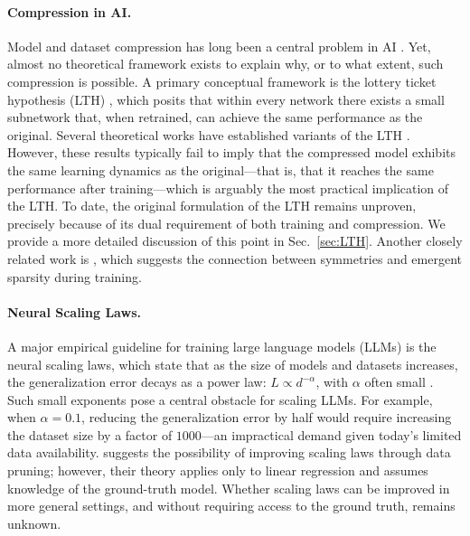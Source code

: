 \documentclass{article}
\theoremstyle{plain}
\begin{document}

\paragraph{Compression in AI.} Model and dataset compression has long been a central problem in AI \citep{han2015deep, frankle2018lottery, sorscher2022beyond, salomon2002data, wang2018dataset}. Yet, almost no theoretical framework exists to explain why, or to what extent, such compression is possible. A primary conceptual framework is the lottery ticket hypothesis (LTH) \citep{frankle2018lottery}, which posits that within every network there exists a small subnetwork that, when retrained, can achieve the same performance as the original. Several theoretical works have established variants of the LTH \citep{malach2020proving, pensia2021optimallotteryticketssubsetsum, da2022proving}. However, these results typically fail to imply that the compressed model exhibits the same learning dynamics as the original—that is, that it reaches the same performance after training—which is arguably the most practical implication of the LTH. To date, the original formulation of the LTH remains unproven, precisely because of its dual requirement of both training and compression. We provide a more detailed discussion of this point in Sec.~\ref{sec:LTH}. Another closely related work is \cite{ziyin2024symmetry}, which suggests the connection between symmetries and emergent sparsity during training.

\vspace{-2mm}
\paragraph{Neural Scaling Laws.} A major empirical guideline for training large language models (LLMs) is the neural scaling laws, which state that as the size of models and datasets increases, the generalization error decays as a power law: $L \propto d^{-\alpha}$, with $\alpha$ often small \citep{kaplan2020scaling}. Such small exponents pose a central obstacle for scaling LLMs. For example, when $\alpha = 0.1$, reducing the generalization error by half would require increasing the dataset size by a factor of $1000$—an impractical demand given today’s limited data availability. \cite{sorscher2022beyond} suggests the possibility of improving scaling laws through data pruning; however, their theory applies only to linear regression and assumes knowledge of the ground-truth model. Whether scaling laws can be improved in more general settings, and without requiring access to the ground truth, remains unknown.
\end{document}
